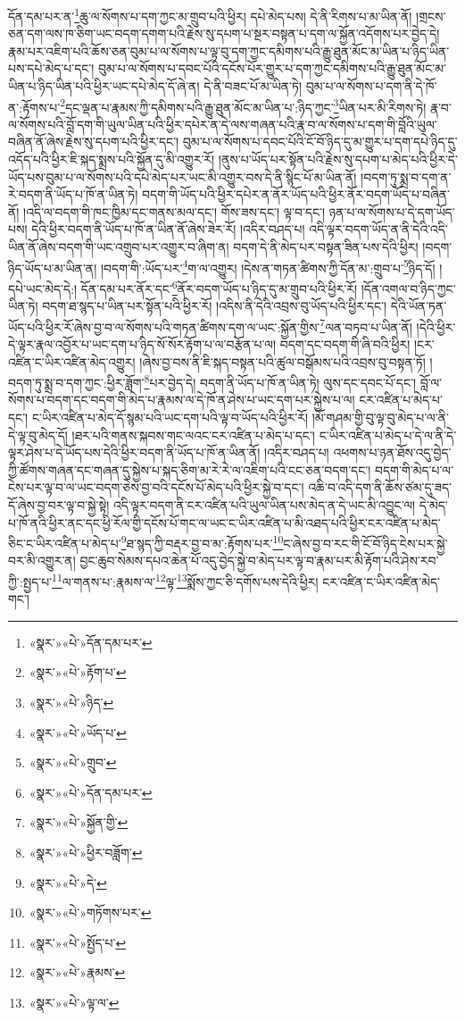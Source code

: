 དོན་དམ་པར་ན་\footnote{«སྣར་»«པེ་»དོན་དམ་པར་}ཆུ་ལ་སོགས་པ་དག་ཀྱང་མ་གྲུབ་པའི་ཕྱིར། དཔེ་མེད་པས། དེ་ནི་རིགས་པ་མ་ཡིན་ནོ། །གྲངས་ཅན་དག་ལས་ཁ་ཅིག་ཡང་བདག་དགག་པའི་རྗེས་སུ་དཔག་པ་སྔར་བསྟན་པ་དག་ལ་སྐྱོན་འདོགས་པར་བྱེད་དེ། རྣམ་པར་འཇིག་པའི་ཆོས་ཅན་བུམ་པ་ལ་སོགས་པ་ལྟ་བུ་དག་ཀྱང་དམིགས་པའི་རྒྱུ་ཐུན་མོང་མ་ཡིན་པ་ཉིད་ཡིན་པས་དཔེ་མེད་པ་དང་། བུམ་པ་ལ་སོགས་པ་དབང་པོའི་དངོས་པོར་གྱུར་པ་དག་ཀྱང་དམིགས་པའི་རྒྱུ་ཐུན་མོང་མ་ཡིན་པ་ཉིད་ཡིན་པའི་ཕྱིར་ཡང་དཔེ་མེད་དོ་ཞེ་ན། དེ་ནི་བཟང་པོ་མ་ཡིན་ཏེ། བུམ་པ་ལ་སོགས་པ་དག་ནི་དེ་ཁོ་ན་:རྟོགས་པ་\footnote{«སྣར་»«པེ་»རྟོག་པ་}དང་ལྡན་པ་རྣམས་ཀྱི་དམིགས་པའི་རྒྱུ་ཐུན་མོང་མ་ཡིན་པ་:ཉིད་ཀྱང་\footnote{«སྣར་»«པེ་»ཉིད་}ཡིན་པར་མི་རིགས་ཏེ། རྣ་བ་ལ་སོགས་པའི་བློ་དག་གི་ཡུལ་ཡིན་པའི་ཕྱིར་དཔེར་ན་དེ་ལས་གཞན་པའི་རྣ་བ་ལ་སོགས་པ་དག་གི་བློའི་ཡུལ་བཞིན་ནོ་ཞེས་རྗེས་སུ་དཔག་པའི་ཕྱིར་དང་། བུམ་པ་ལ་སོགས་པ་དབང་པོའི་ངོ་བོ་ཉིད་དུ་མ་གྱུར་པ་དག་དཔེ་ཉིད་དུ་འདོད་པའི་ཕྱིར་ཇི་སྐད་སྨྲས་པའི་སྐྱོན་དུ་མི་འགྱུར་རོ། །ནུས་པ་ཡོད་པར་སྟོན་པའི་རྗེས་སུ་དཔག་པ་མེད་པའི་ཕྱིར་དེ་ཡོད་པས་བུམ་པ་ལ་སོགས་པའི་དཔེ་མེད་པར་ཡང་མི་འགྱུར་བས་དེ་ནི་སྙིང་པོ་མ་ཡིན་ནོ། །བདག་ཏུ་སྨྲ་བ་དག་ན་རེ་བདག་ནི་ཡོད་པ་ཁོ་ན་ཡིན་ཏེ། བདག་གི་ཡོད་པའི་ཕྱིར་དཔེར་ན་ནོར་ཡོད་པའི་ཕྱིར་ནོར་བདག་ཡོད་པ་བཞིན་ནོ། །འདི་ལ་བདག་གི་ཁང་ཁྱིམ་དང་གནས་མལ་དང་། གོས་ཟས་དང་། ལྟ་བ་དང་། ཉན་པ་ལ་སོགས་པ་དེ་དག་ཡོད་པས། དེའི་ཕྱིར་བདག་ནི་ཡོད་པ་ཁོ་ན་ཡིན་ནོ་ཞེས་ཟེར་རོ། །འདིར་བཤད་པ། འདི་ལྟར་བདག་ཡོད་ན་ནི་དེའི་འདི་ཡིན་ནོ་ཞེས་བདག་གི་ཡང་འགྲུབ་པར་འགྱུར་བ་ཞིག་ན། བདག་དེ་ནི་མེད་པར་བསྟན་ཟིན་པས་དེའི་ཕྱིར། །བདག་ཉིད་ཡོད་པ་མ་ཡིན་ན། །བདག་གི་:ཡོད་པར་\footnote{«སྣར་»«པེ་»ཡོད་པ་}ག་ལ་འགྱུར། །དེས་ན་གཏན་ཚིགས་ཀྱི་དོན་མ་:གྲུབ་པ་\footnote{«སྣར་»«པེ་»གྲུབ་}ཉིད་དོ། །དཔེ་ཡང་མེད་དེ:། དོན་དམ་པར་ནོར་དང་\footnote{«སྣར་»«པེ་»དོན་དམ་པར་}ནོར་བདག་ཡོད་པ་ཉིད་དུ་མ་གྲུབ་པའི་ཕྱིར་རོ། །དོན་འགལ་བ་ཉིད་ཀྱང་ཡིན་ཏེ། བདག་ཐ་སྙད་པ་ཡིན་པར་སྟོན་པའི་ཕྱིར་རོ། །འདིས་ནི་དེའི་འབྲས་བུ་ཡོད་པའི་ཕྱིར་དང་། དེའི་ཡོན་ཏན་ཡོད་པའི་ཕྱིར་རོ་ཞེས་བྱ་བ་ལ་སོགས་པའི་གཏན་ཚིགས་དག་ལ་ཡང་:སྐྱོན་གྱིས་\footnote{«སྣར་»«པེ་»སྐྱོན་གྱི་}ལན་བཏབ་པ་ཡིན་ནོ། །དེའི་ཕྱིར་དེ་ལྟར་རྣལ་འབྱོར་པ་ཡང་དག་པ་ཉིད་སོ་སོར་རྟོག་པ་ལ་བརྩོན་པ་ལ། བདག་དང་བདག་གི་ཞི་བའི་ཕྱིར། །ངར་འཛིན་ང་ཡིར་འཛིན་མེད་འགྱུར། །ཞེས་བྱ་བས་ནི་ཇི་སྐད་བསྟན་པའི་ཚུལ་བསྒོམས་པའི་འབྲས་བུ་བསྟན་ཏོ། །བདག་ཏུ་སྨྲ་བ་དག་ཀྱང་:ཕྱིར་ཟློག་\footnote{«སྣར་»«པེ་»ཕྱིར་བཟློག་}པར་བྱེད་དེ། བདག་ནི་ཡོད་པ་ཁོ་ན་ཡིན་ཏེ། ལུས་དང་དབང་པོ་དང་། བློ་ལ་སོགས་པ་བདག་དང་བདག་གི་མེད་པ་རྣམས་ལ་དེ་ཁོ་ན་ཤེས་པ་ཡང་དག་པར་སྐྱེས་པ་ལ། ངར་འཛིན་པ་མེད་པ་དང་། ང་ཡིར་འཛིན་པ་མེད་དོ་སྙམ་པའི་ཡང་དག་པའི་ལྟ་བ་ཡོད་པའི་ཕྱིར་རོ། །མོ་གཤམ་གྱི་བུ་ལྟ་བུ་མེད་པ་ལ་ནི་དེ་ལྟ་བུ་མེད་དོ། །ཐར་པའི་གནས་སྐབས་གང་ལའང་ངར་འཛིན་པ་མེད་པ་དང་། ང་ཡིར་འཛིན་པ་མེད་པ་དེ་ལ་ནི་དེ་ལྟར་ཤེས་པ་དེ་ཡོད་པས་དེའི་ཕྱིར་བདག་ནི་ཡོད་པ་ཁོ་ན་ཡིན་ནོ། །འདིར་བཤད་པ། འཕགས་པ་ཉན་ཐོས་འདུ་བྱེད་ཀྱི་ཚོགས་གཞན་དང་གཞན་དུ་སྐྱེས་པ་སྐད་ཅིག་མ་རེ་རེ་ལ་འཇིག་པའི་ངང་ཅན་བདག་དང་། བདག་གི་མེད་པ་ལ་ངེས་པར་ལྟ་བ་ལ་ཡང་བདག་ཅེས་བྱ་བའི་དངོས་པོ་མེད་པའི་ཕྱིར་སྐྱེ་བ་དང་། འཆི་བ་འདི་དག་ནི་ཆོས་ཙམ་དུ་ཟད་དོ་ཞེས་བྱ་བར་ལྟ་བ་སྐྱེ་སྟེ། འདི་ལྟར་བདག་ནི་ངར་འཛིན་པའི་ཡུལ་ཡིན་པས་མེད་ན་དེ་ཡང་མི་འབྱུང་ལ། དེ་མེད་པ་ཁོ་ནའི་ཕྱིར་ནང་དང་ཕྱི་རོལ་གྱི་དངོས་པོ་གང་ལ་ཡང་ང་ཡིར་འཛིན་པ་མི་འཐད་པའི་ཕྱིར་ངར་འཛིན་པ་མེད་ཅིང་ང་ཡིར་འཛིན་པ་མེད་པ་\footnote{«སྣར་»«པེ་»དེ་}ཐ་སྙད་ཀྱི་བརྡར་བྱ་བ་མ་:རྟོགས་པར་\footnote{«སྣར་»«པེ་»གཏོགས་པར་}ང་ཞེས་བྱ་བ་རང་གི་ངོ་བོ་ཉིད་ངེས་པར་སྐྱེ་བར་མི་འགྱུར་ན། བྱང་ཆུབ་སེམས་དཔའ་ཆེན་པོ་འདུ་བྱེད་སྐྱེ་བ་མེད་པར་ལྟ་བ་རྣམ་པར་མི་རྟོག་པའི་ཤེས་རབ་ཀྱི་:སྤྱད་པ་\footnote{«སྣར་»«པེ་»སྤྱོད་པ་}ལ་གནས་པ་:རྣམས་ལ་\footnote{«སྣར་»«པེ་»རྣམས་}ལྟ་\footnote{«སྣར་»«པེ་»ལྟ་ལ་}སྨོས་ཀྱང་ཅི་དགོས་པས་དེའི་ཕྱིར། ངར་འཛིན་ང་ཡིར་འཛིན་མེད་གང་། 
